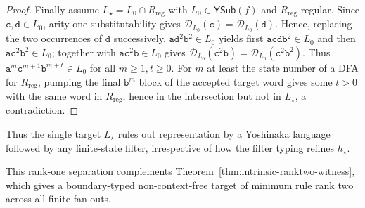 \documentclass[11pt]{article}
\numberwithin{equation}{section}
\theoremstyle{plain}
\theoremstyle{definition}
\theoremstyle{remark}
\newcommand{\D}{\mathcal{D}}
\newcommand{\YSub}[1]{\mathsf{YSub}(#1)}
\theoremstyle{plain}
\begin{document}
\begin{proof}
Finally assume $L_\star=L_0\cap R_{\mathrm{reg}}$ with
$L_0\in\YSub{f}$ and $R_{\mathrm{reg}}$ regular.  Since
$\mathtt c,\mathtt d\in L_0$, arity-one substitutability gives
$\D_{L_0}(\mathtt c)=\D_{L_0}(\mathtt d)$.  Hence, replacing the two occurrences of $\mathtt d$ successively,
$\mathtt a\mathtt d^2\mathtt b^2\in L_0$ yields first
$\mathtt a\mathtt c\mathtt d\mathtt b^2\in L_0$ and then
$\mathtt a\mathtt c^2\mathtt b^2\in L_0$; together with
$\mathtt a\mathtt c^2\mathtt b\in L_0$ gives
\(\D_{L_0}(\mathtt c^2\mathtt b) =\D_{L_0}(\mathtt c^2\mathtt b^2).\)
Thus $\mathtt a^m\mathtt c^{m+1}\mathtt b^{m+t}\in L_0$ for all
$m\ge1,t\ge0$.  For $m$ at least the state number of a DFA for
$R_{\mathrm{reg}}$, pumping the final $\mathtt b^m$ block of the accepted
target word gives some $t>0$ with the same word in $R_{\mathrm{reg}}$, hence
in the intersection but not in $L_\star$, a contradiction.
\end{proof}

Thus the single target $L_\star$ rules out representation by a Yoshinaka
language followed by any finite-state filter, irrespective of how the filter
typing refines $h_\star$.

This rank-one separation complements
Theorem~\ref{thm:intrinsic-ranktwo-witness},
which gives a boundary-typed non-context-free
target of minimum rule rank two across all finite fan-outs.
\end{document}
